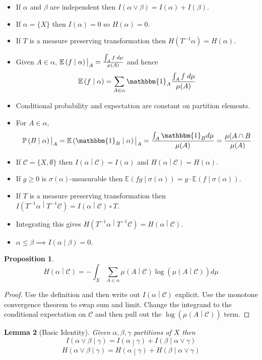 \documentclass[11pt]{article}
\newcommand{\indic}[1]{\mathbbm{1}_{#1}}
\newcommand\restr[2]{{%
  \left.\kern-\nulldelimiterspace %
  #1 %
  \vphantom{\big|} %
  \right|_{#2} %
  }}
\newcommand{\relmiddle}[1]{\mathrel{}\middle#1\mathrel{}}
\newcommand{\rmv}{\relmiddle|}
\newcommand{\gvn}[2]{\ensuremath{\left(#1\rmv#2\right)}}
\newcommand{\expg}[2]{\ensuremath{\mathbb{E}\gvn{#1}{#2}}}
\newcommand{\infog}[2]{\ensuremath{I\gvn{#1}{#2}}}
\newcommand{\entrg}[2]{\ensuremath{H\gvn{#1}{#2}}}
\newcommand{\probg}[2]{\ensuremath{\mathbb{P}\gvn{#1}{#2}}}
\newtheorem{prop}{Proposition}[section]
\newtheorem{lemma}[prop]{Lemma}
\begin{document}
\begin{itemize}
	\item If $\alpha$ and $\beta$ are independent then $I(\alpha\vee\beta)=I(\alpha)+I(\beta)$.
	\item If $\alpha=\{X\}$ then $I(\alpha)=0$ so $H(\alpha)=0$.
	\item If $T$ is a measure preserving transformation then $H(T^{-1}\alpha)=H(\alpha)$.
	\item Given $A\in\alpha$, $\restr{\expg{f}{\alpha}}{A}=\frac{\int_A f \;d\mu}{\mu(A)}$ and hence
		$$\expg{f}{\alpha}=\sum_{A\in\alpha}\indic{A}\frac{\int_A f \;d\mu}{\mu(A)}$$
	\item Conditional probability and expectation are constant on partition elements.
	\item For $A\in\alpha$, 
		$$\restr{\probg{B}{\alpha}}{A}=\restr{\expg{\indic{B}}{\alpha}}{A}=\frac{\int_A \indic{B} d\mu}{\mu(A)}=\frac{\mu(A\cap B}{\mu(A)}$$
	\item If $\mathcal{C}=\{X,\emptyset\}$ then $\infog{\alpha}{\mathcal{C}}=I(\alpha)$ and $\entrg{\alpha}{\mathcal{C}}=H(\alpha)$.
	\item If $g\geq 0$ is $\sigma(\alpha)$-measurable then $\expg{fg}{\sigma(\alpha)}=g\cdot\expg{f}{\sigma(\alpha)}$.
	\item If $T$ is a measure preserving transformation then $\infog{T^{-1}\alpha}{T^{-1}\mathcal{C}}=\infog{\alpha}{\mathcal{C}}\circ T$.
	\item Integrating this gives $\entrg{T^{-1}\alpha}{T^{-1}\mathcal{C}}=\entrg{\alpha}{\mathcal{C}}$.
	\item $\alpha\leq\beta\implies\infog{\alpha}{\beta}=0$.
\end{itemize}


\begin{prop}
	$$\entrg{\alpha}{\mathcal{C}}=-\int_X \sum_{A\in\alpha}\mu\gvn{A}{\mathcal{C}}\log(\mu\gvn{A}{\mathcal{C}})d\mu$$	
\end{prop}

\begin{proof}
Use the definition and then write out $\infog{\alpha}{\mathcal{C}}$ explicit.
Use the monotone convergence theorem to swap sum and limit.
Change the integrand to the conditional expectation on $\mathcal{C}$ and then pull out the $\log(\mu\gvn{A}{\mathcal{C}})$ term.
\end{proof}

\begin{lemma}[Basic Identity]
	Given $\alpha,\beta,\gamma$ partitions of $X$ then
	$$\infog{\alpha\vee\beta}{\gamma}=\infog{\alpha}{\gamma}+\infog{\beta}{\alpha\vee\gamma}$$
	$$\entrg{\alpha\vee\beta}{\gamma}=\entrg{\alpha}{\gamma}+\entrg{\beta}{\alpha\vee\gamma}$$
\end{lemma}
\end{document}
